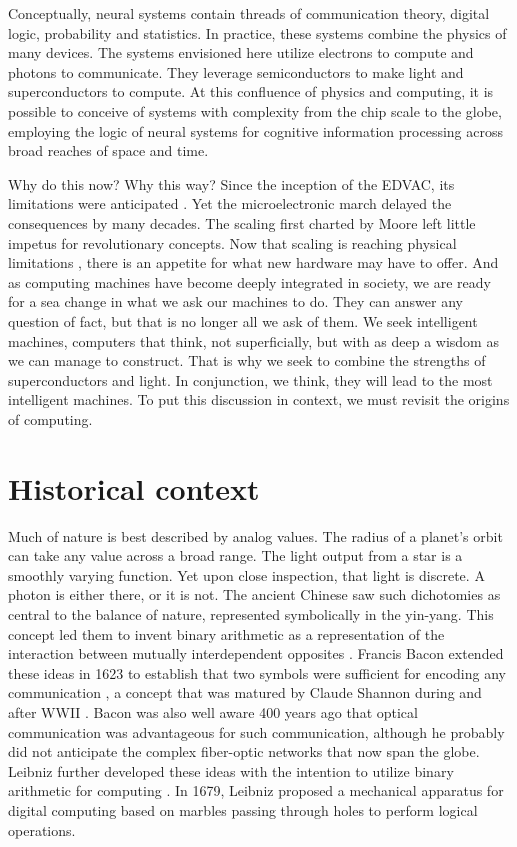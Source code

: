 \documentclass[twocolumn]{article}
\begin{document}
Conceptually, neural systems contain threads of communication theory, digital logic, probability and statistics. In practice, these systems combine the physics of many devices. The systems envisioned here utilize electrons to compute and photons to communicate. They leverage semiconductors to make light and superconductors to compute. At this confluence of physics and computing, it is possible to conceive of systems with complexity from the chip scale to the globe, employing the logic of neural systems for cognitive information processing across broad reaches of space and time. 

Why do this now? Why this way? Since the inception of the EDVAC, its limitations were anticipated \cite{}. Yet the microelectronic march delayed the consequences by many decades. The scaling first charted by Moore \cite{} left little impetus for revolutionary concepts. Now that scaling is reaching physical limitations \cite{}, there is an appetite for what new hardware may have to offer. And as computing machines have become deeply integrated in society, we are ready for a sea change in what we ask our machines to do. They can answer any question of fact, but that is no longer all we ask of them. We seek intelligent machines, computers that think, not superficially, but with as deep a wisdom as we can manage to construct. That is why we seek to combine the strengths of superconductors and light. In conjunction, we think, they will lead to the most intelligent machines. To put this discussion in context, we must revisit the origins of computing.

\section{\label{sec:history}Historical context}
Much of nature is best described by analog values. The radius of a planet's orbit can take any value across a broad range. The light output from a star is a smoothly varying function. Yet upon close inspection, that light is discrete. A photon is either there, or it is not. The ancient Chinese saw such dichotomies as central to the balance of nature, represented symbolically in the yin-yang. This concept led them to invent binary arithmetic as a representation of the interaction between mutually interdependent opposites \cite{http://www.atimes.com/leibniz-chinese-invented-first-binary-code/}. Francis Bacon extended these ideas in 1623 to establish that two symbols were sufficient for encoding any communication \cite{dy2012}, a concept that was matured by Claude Shannon during and after WWII \cite{sh1948}. Bacon was also well aware 400 years ago that optical communication was advantageous for such communication, although he probably did not anticipate the complex fiber-optic networks that now span the globe. Leibniz further developed these ideas \cite{http://www.leibniz-translations.com/binary.htm} with the intention to utilize binary arithmetic for computing \cite{https://hal.archives-ouvertes.fr/ads-00104781/document,dy2012}. In 1679, Leibniz proposed a mechanical apparatus for digital computing based on marbles passing through holes to perform logical operations. 
\end{document}
